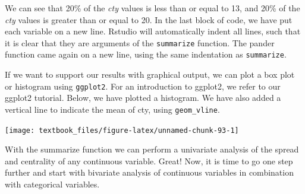\documentclass[]{tufte-book}
\newenvironment{Shaded}{}{}
\newcommand{\DataTypeTok}[1]{\textcolor[rgb]{0.56,0.13,0.00}{#1}}
\newcommand{\DecValTok}[1]{\textcolor[rgb]{0.25,0.63,0.44}{#1}}
\newcommand{\FloatTok}[1]{\textcolor[rgb]{0.25,0.63,0.44}{#1}}
\newcommand{\KeywordTok}[1]{\textcolor[rgb]{0.00,0.44,0.13}{\textbf{#1}}}
\newcommand{\NormalTok}[1]{#1}
\newcommand{\OperatorTok}[1]{\textcolor[rgb]{0.40,0.40,0.40}{#1}}
\newcommand{\StringTok}[1]{\textcolor[rgb]{0.25,0.44,0.63}{#1}}
\begin{document}
We can see that 20\% of the \emph{cty} values is less than or equal to 13, and 20\% of the \emph{cty} values is greater than or equal to 20. In the last block of code, we have put each variable on a new line. Rstudio will automatically indent all lines, such that it is clear that they are arguments of the \texttt{summarize} function. The pander function came again on a new line, using the same indentation as \texttt{summarize}.

If we want to support our results with graphical output, we can plot a box plot or histogram using \texttt{ggplot2}. For an introduction to ggplot2, we refer to our ggplot2 tutorial. Below, we have plotted a histogram. We have also added a vertical line to indicate the mean of cty, using \texttt{geom\_vline}.

\begin{Shaded}
\end{Shaded}

\texttt{[image: textbook\_files/figure-latex/unnamed-chunk-93-1]}

With the summarize function we can perform a univariate analysis of the spread and centrality of any continuous variable. Great! Now, it is time to go one step further and start with bivariate analysis of continuous variables in combination with categorical variables.
\end{document}
